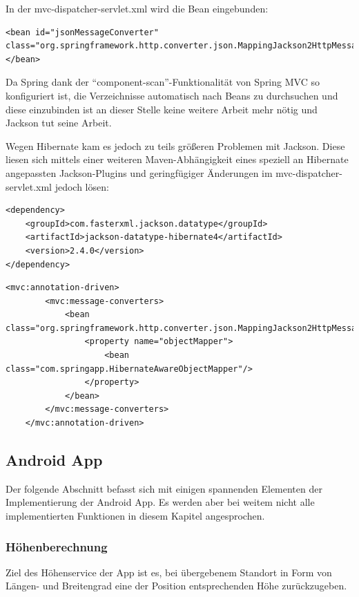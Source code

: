 In der mvc-dispatcher-servlet.xml wird die Bean eingebunden:
\lstset{language=xml}
\begin{lstlisting}[frame=htrbl, caption={Konfiguration von Jackson}, breaklines=true]
<bean id="jsonMessageConverter" class="org.springframework.http.converter.json.MappingJackson2HttpMessageConverter">
</bean>
\end{lstlisting}

Da Spring dank der ``component-scan''-Funktionalität von Spring MVC so konfiguriert ist, die Verzeichnisse automatisch nach Beans zu durchsuchen und diese einzubinden ist an dieser Stelle keine weitere Arbeit mehr nötig und Jackson tut seine Arbeit.

Wegen Hibernate kam es jedoch zu teils größeren Problemen mit Jackson. Diese liesen sich mittels einer weiteren Maven-Abhängigkeit eines speziell an Hibernate angepassten Jackson-Plugins und geringfügiger Änderungen im mvc-dispatcher-servlet.xml jedoch lösen:
\lstset{language=xml}
\begin{lstlisting}[frame=htrbl, caption={Einbindung von Jackson-datatype-hibernate4 in Maven}, breaklines=true]
<dependency>
	<groupId>com.fasterxml.jackson.datatype</groupId>
	<artifactId>jackson-datatype-hibernate4</artifactId>
	<version>2.4.0</version>
</dependency>
\end{lstlisting}
\lstset{language=xml}
\begin{lstlisting}[frame=htrbl, caption={Konfiguration von Jackson und Hibernate}, breaklines=true]
<mvc:annotation-driven>
        <mvc:message-converters>
            <bean class="org.springframework.http.converter.json.MappingJackson2HttpMessageConverter">
                <property name="objectMapper">
                    <bean class="com.springapp.HibernateAwareObjectMapper"/>
                </property>
            </bean>
        </mvc:message-converters>
    </mvc:annotation-driven>
\end{lstlisting}
\subsection{Android App}
Der folgende Abschnitt befasst sich mit einigen spannenden Elementen der Implementierung der Android App. Es werden aber bei weitem nicht alle implementierten Funktionen in diesem Kapitel angesprochen.
\subsubsection{Höhenberechnung}
Ziel des Höhenservice der App ist es, bei übergebenem Standort in Form von Längen- und Breitengrad eine der Position entsprechenden Höhe zurückzugeben.

